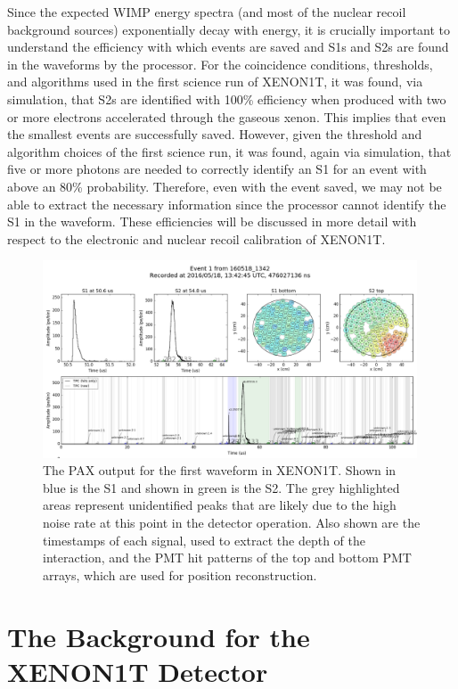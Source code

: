 Since the expected WIMP energy spectra (and most of the nuclear recoil background sources) exponentially decay with energy, it is crucially important to understand the efficiency with which events are saved and S1s and S2s are found in the waveforms by the processor.  For the coincidence conditions, thresholds, and algorithms used in the first science run of XENON1T, it was found, via simulation, that S2s are identified with 100\% efficiency when produced with two or more electrons accelerated through the gaseous xenon.  This implies that even the smallest events are successfully saved.  However, given the threshold and algorithm choices of the first science run, it was found, again via simulation, that five or more photons are needed to correctly identify an S1 for an event with above an 80\% probability.  Therefore, even with the event saved, we may not be able to extract the necessary information since the processor cannot identify the S1 in the waveform.  These efficiencies will be discussed in more detail with respect to the electronic and nuclear recoil calibration of XENON1T.

\begin{figure}[t]
	\centering
	\includegraphics[width=0.99\textwidth]{xe1t_pax_output_first_waveform}
	\caption{The PAX output for the first waveform in XENON1T.  Shown in blue is the S1 and shown in green is the S2.  The grey highlighted areas represent unidentified peaks that are likely due to the high noise rate at this point in the detector operation.  Also shown are the timestamps of each signal, used to extract the depth of the interaction, and the PMT hit patterns of the top and bottom PMT arrays, which are used for position reconstruction.}
	\label{fig:xe1t_pax_output_first_waveform}
\end{figure}


\section{The Background for the XENON1T Detector}
\label{sec:xe1t_bkg}

